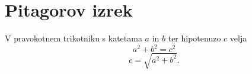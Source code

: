 \documentclass{article}
\begin{document}
\section*{Pitagorov izrek}
V pravokotnem trikotniku s katetama \(a\) in \(b\) ter hipotenuzo \(c\) velja
\[ a^2 + b^2 = c^2 \]
\[c=\sqrt{a^2+b^2}.\]
\end{document}
